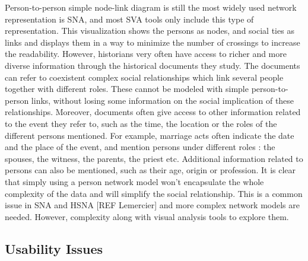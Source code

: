 Person-to-person simple node-link diagram is still the most widely used network representation is SNA, and most SVA tools only include this type of representation. This visualization shows the persons as nodes, and social ties as links and displays them in a way to minimize the number of crossings to increase the readability. However, historians very often have access to richer and more diverse information through the historical documents they study. The documents can refer to coexistent complex social relationships which link several people together with different roles. These cannot be modeled with simple person-to-person links, without losing some information on the social implication of these relationships. Moreover, documents often give access to other information related to the event they refer to, such as the time, the location or the roles of the different persons mentioned. For example, marriage acts often indicate the date and the place of the event, and mention persons under different roles : the spouses, the witness, the parents, the priest etc. Additional information related to persons can also be mentioned, such as their age, origin or profession. It is clear that simply using a person network model won’t encapsulate the whole complexity of the data and will simplify the social relationship. This is a common issue in SNA and HSNA [REF Lemercier] and more complex network models are needed. However, complexity
along with visual analysis tools to explore them.

\subsection{Usability Issues}

